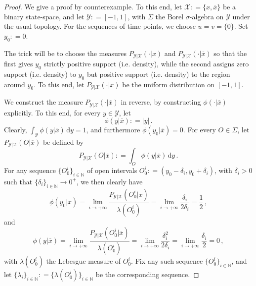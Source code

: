 \documentclass[twoside,11pt]{article}
\newcommand{\nats}{\mathbb{N}}
\newcommand{\states}{\mathcal{X}}
\newcommand{\observs}{\mathcal{Y}}
\newcommand{\abs}[1]{\left\vert #1 \right\vert}
\newcommand{\coloneqq}{:\!=}
\begin{document}
\begin{proof}
We give a proof by counterexample. To this end, let $\states\coloneqq\{x,\overline{x}\}$ be a binary state-space, and let $\observs\coloneqq [-1,1]$, with $\Sigma$ the Borel $\sigma$-algebra on $\observs$ under the usual topology. For the sequences of time-points, we choose $u=v=\{0\}$. Set $y_0\coloneqq 0$.

The trick will be to choose the measures $P_{\observs\vert\states}(\cdot\vert x)$ and $P_{\observs\vert\states}(\cdot\vert \overline{x})$ so that the first gives $y_0$ strictly positive support (i.e. density), while the second assigns zero support (i.e. density) to $y_0$ but positive support (i.e. density) to the region around $y_0$. To this end, let $P_{\observs\vert\states}(\cdot\vert x)$ be the uniform distribution on $[-1,1]$.

We construct the measure $P_{\observs\vert\states}(\cdot\vert \overline{x})$ in reverse, by constructing $\phi(\cdot\vert\overline{x})$ explicitly. To this end, for every $y\in\observs$, let
\begin{equation*}
\phi(y\vert\overline{x}) \coloneqq \abs{y}\,.
\end{equation*}
Clearly, $\int_\observs \phi(y\vert\overline{x})\,\mathrm{d}y = 1$, and furthermore $\phi(y_0\vert\overline{x})=0$. For every $O\in\Sigma$, let $P_{\observs\vert\states}(O\vert\overline{x})$ be defined by
\begin{equation*}
P_{\observs\vert\states}(O\vert\overline{x}) \coloneqq \int_O\phi(y\vert\overline{x})\,\mathrm{d}y\,.
\end{equation*}
For any sequence $\{O_0^i\}_{i\in\nats}$ of open intervals $O_0^i\coloneqq (y_0-\delta_i,y_0+\delta_i)$, with $\delta_i>0$ such that $\{\delta_i\}_{i\in\nats}\to0^+$, we then clearly have
\begin{equation*}
\phi(y_0\vert x) = \lim_{i\to+\infty} \frac{P_{\observs\vert\states}(O_0^i\vert x)}{\lambda(O_0^i)} = \lim_{i\to+\infty} \frac{\delta_i}{2\delta_i} = \frac{1}{2}\,,
\end{equation*}
and
\begin{equation*}
\phi(y\vert \overline{x}) = \lim_{i\to+\infty} \frac{P_{\observs\vert\states}(O_0^i\vert \overline{x})}{\lambda(O_0^i)} = \lim_{i\to+\infty} \frac{\delta_i^2}{2\delta_i} = \lim_{i\to+\infty} \frac{\delta_i}{2} = 0\,,
\end{equation*}
with $\lambda(O_0^i)$ the Lebesgue measure of $O_0^i$. Fix any such sequence $\{O_0^i\}_{i\in\nats}$, and let $\{\lambda_i\}_{i\in\nats}\coloneqq\{\lambda(O_0^i)\}_{i\in\nats}$ be the corresponding sequence.


\end{proof}
\end{document}
